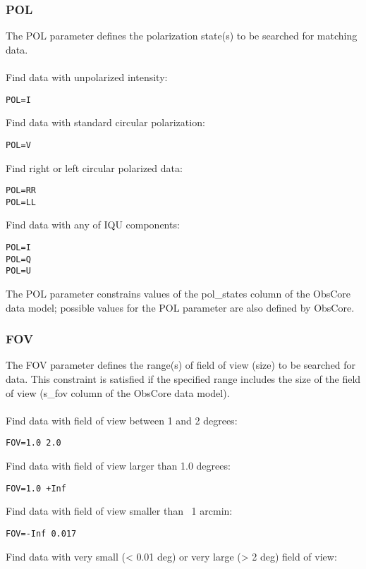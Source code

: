 \documentclass[11pt,a4paper]{ivoa}
\begin{document}
\subsubsection{POL}
\label{sec:POL}

The POL parameter defines the polarization state(s) to be searched  for matching data.  \\ \\
Find data with unpolarized intensity:

\begin{lstlisting}
POL=I
\end{lstlisting}
Find data with standard circular polarization:

\begin{lstlisting}
POL=V
\end{lstlisting}
Find  right or left circular polarized data:

\begin{lstlisting}
POL=RR
POL=LL
\end{lstlisting}
Find data with any of IQU components:

\begin{lstlisting}
POL=I
POL=Q
POL=U
\end{lstlisting}

The POL parameter constrains values of the pol\_states column of the ObsCore data model; possible values for the POL parameter are also defined by ObsCore.


\subsubsection{FOV}

The FOV parameter defines the range(s) of field of view (size) to be searched for data. This constraint is satisfied if the specified range includes the size of the field of view (s\_fov column of the ObsCore data model). \\ \\
Find data with field of view between 1 and 2 degrees:

\begin{lstlisting}
FOV=1.0 2.0
\end{lstlisting}
Find data with field of view larger than 1.0 degrees:

\begin{lstlisting}
FOV=1.0 +Inf
\end{lstlisting}
Find data with field of view smaller than ~1 arcmin:

\begin{lstlisting}
FOV=-Inf 0.017
\end{lstlisting}
Find data with very small (< 0.01 deg) or very large (> 2 deg) field of view:
\end{document}
